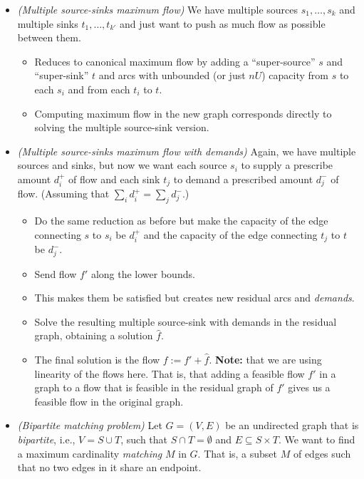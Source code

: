 \documentclass{article}
\begin{document}
\begin{itemize}
\item {\em (Multiple source-sinks maximum flow)} We have multiple sources $s_1, \ldots, s_k$ and multiple sinks $t_1, \ldots, t_{k'}$ and just want to push as much flow as possible between them. 

\begin{itemize}
\item Reduces to canonical maximum flow by adding a ``super-source'' $s$ and ``super-sink'' $t$ and arcs with unbounded (or just $nU$) capacity from $s$ to each $s_i$ and from each $t_i$ to $t$.
\item Computing maximum flow in the new graph corresponds directly to solving the multiple source-sink version. 
\end{itemize}


\item {\em (Multiple source-sinks maximum flow with demands)} Again, we have multiple sources and sinks, but now we want each source $s_i$ to supply a prescribe amount $d_i^+$ of flow and each sink $t_j$ to demand a prescribed amount $d_j^-$ of flow. (Assuming that $\sum_i d_i^+ = \sum_j d_j^-$.) 

\begin{itemize}
\item Do the same reduction as before but make the capacity of the edge connecting $s$ to $s_i$ be $d_i^+$ and the capacity of the edge connecting $t_j$ to $t$ be $d_j^-$.

\item Send flow $f'$ along the lower bounds. 

\item This makes them be satisfied but creates new residual arcs and {\em demands}.

\item Solve the resulting multiple source-sink with demands in the residual graph, obtaining a solution $\hat{f}$.

\item The final solution is the flow $f:=f'+\hat{f}$. \textbf{Note:} that we are using linearity of the flows here. That is, that adding a feasible flow $f'$ in a graph to a flow that is feasible in the residual graph of $f'$ gives us a feasible flow in the original graph. 

\end{itemize}


\item {\em (Bipartite matching problem)} Let $G=(V,E)$ be an undirected graph that is {\em bipartite}, i.e., $V=S\cup T$, such that $S\cap T=\emptyset$ and $E\subseteq S\times T$. We want to find a maximum cardinality {\em matching} $M$ in $G$. That is, a subset $M$ of edges such that no two edges in it share an endpoint.  


\end{itemize}
\end{document}
